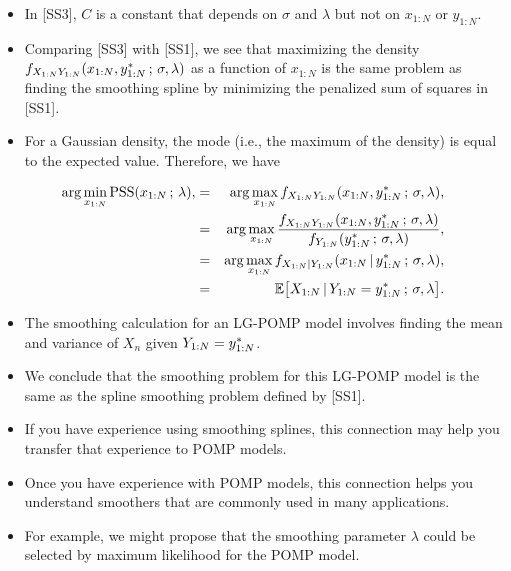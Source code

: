 \documentclass[]{article}
\begin{document}
\begin{itemize}
\item
  In {[}SS3{]}, \(C\) is a constant that depends on \(\sigma\) and
  \(\lambda\) but not on \(x_{1:N}\) or \(y_{1:N}\).
\item
  Comparing {[}SS3{]} with {[}SS1{]}, we see that maximizing the density
  \(f_{X_{1:N}Y_{1:N}}(x_{1:N},y_{1:N}^* \, ; \, \sigma,\lambda)\)
  as a function of \(x_{1:N}\) is the same problem as finding the
  smoothing spline by minimizing the penalized sum of squares in
  {[}SS1{]}.
\item
  For a Gaussian density, the mode (i.e., the maximum of the density) is
  equal to the expected value. Therefore, we have
\end{itemize}

\begin{eqnarray}
\arg\min_{x_{1:N}} \mathrm{PSS}(x_{1:N}\, ; \,\lambda),
&=& 
\arg\max_{x_{1:N}} f_{X_{1:N}Y_{1:N}}(x_{1:N},y_{1:N}^*\, ; \, \sigma,\lambda),
\\
&=&
\arg\max_{x_{1:N}} \frac{
  f_{X_{1:N}Y_{1:N}}(x_{1:N},y_{1:N}^* \, ; \, \sigma,\lambda)
}{
  f_{Y_{1:N}}(y_{1:N}^* \, ; \, \sigma,\lambda)
},
\\
&=& 
\arg\max_{x_{1:N}} f_{X_{1:N}|Y_{1:N}}(x_{1:N}{\, | \,} y_{1:N}^*\, ; \, \sigma,\lambda),
\\
&=& \mathbb{E}\big[X_{1:N}{\, | \,} Y_{1:N}=y_{1:N}^* \, ; \,  \sigma,\lambda\big].
\end{eqnarray}

\begin{itemize}
\item
  The smoothing calculation for an LG-POMP model involves finding the
  mean and variance of \(X_{n}\) given \(Y_{1:N}=y_{1:N}^*\).
\item
  We conclude that the smoothing problem for this LG-POMP model is the
  same as the spline smoothing problem defined by {[}SS1{]}.
\item
  If you have experience using smoothing splines, this connection may
  help you transfer that experience to POMP models.
\item
  Once you have experience with POMP models, this connection helps you
  understand smoothers that are commonly used in many applications.
\item
  For example, we might propose that the smoothing parameter \(\lambda\)
  could be selected by maximum likelihood for the POMP model.
\end{itemize}
\end{document}
